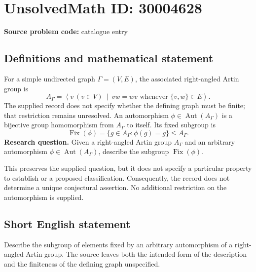 \documentclass[11pt]{article}
\begin{document}
\section*{UnsolvedMath ID: 30004628}
\textbf{Source problem code:} catalogue entry
\subsection{Definitions and mathematical statement}
For a simple undirected graph \(\Gamma=(V,E)\), the associated right-angled Artin group is
\[
A_\Gamma=\left\langle v\ (v\in V)\ \middle|\ vw=wv\text{ whenever }\{v,w\}\in E\right\rangle.
\]
The supplied record does not specify whether the defining graph must be finite; that restriction remains unresolved. An automorphism \(\phi\in\operatorname{Aut}(A_\Gamma)\) is a bijective group homomorphism from \(A_\Gamma\) to itself. Its fixed subgroup is
\[
\operatorname{Fix}(\phi)=\{g\in A_\Gamma:\phi(g)=g\}\leq A_\Gamma.
\]
\textbf{Research question.} Given a right-angled Artin group \(A_\Gamma\) and an arbitrary automorphism \(\phi\in\operatorname{Aut}(A_\Gamma)\), describe the subgroup \(\operatorname{Fix}(\phi)\).

This preserves the supplied question, but it does not specify a particular property to establish or a proposed classification. Consequently, the record does not determine a unique conjectural assertion. No additional restriction on the automorphism is supplied.
\subsection{Short English statement}
Describe the subgroup of elements fixed by an arbitrary automorphism of a right-angled Artin group. The source leaves both the intended form of the description and the finiteness of the defining graph unspecified.
\end{document}

